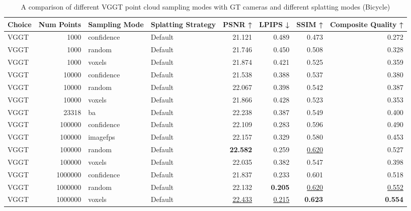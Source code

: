 \begin{table}[H]
\caption{A comparison of different VGGT point cloud sampling modes with GT cameras and different splatting modes (Bicycle)}
\label{tab:03_sampling_mode_splatting_strat_bicycle}
\small
\begin{tabular}{lrllrrrr}
\toprule
Choice & Num Points & Sampling Mode & Splatting Strategy & PSNR ↑ & LPIPS ↓ & SSIM ↑ & Composite Quality ↑ \\
\midrule
VGGT & 1000 & confidence & Default & 21.121 & 0.489 & 0.473 & 0.272 \\
VGGT & 1000 & random & Default & 21.746 & 0.450 & 0.508 & 0.328 \\
VGGT & 1000 & voxels & Default & 21.874 & 0.421 & 0.525 & 0.359 \\
VGGT & 10000 & confidence & Default & 21.538 & 0.388 & 0.537 & 0.380 \\
VGGT & 10000 & random & Default & 22.067 & 0.398 & 0.542 & 0.387 \\
VGGT & 10000 & voxels & Default & 21.866 & 0.428 & 0.523 & 0.353 \\
VGGT & 23318 & ba & Default & 22.238 & 0.387 & 0.549 & 0.400 \\
VGGT & 100000 & confidence & Default & 22.109 & 0.283 & 0.596 & 0.490 \\
VGGT & 100000 & imagefps & Default & 22.157 & 0.329 & 0.580 & 0.453 \\
VGGT & 100000 & random & Default & \textbf{22.582} & 0.259 & \underline{0.620} & 0.527 \\
VGGT & 100000 & voxels & Default & 22.035 & 0.382 & 0.547 & 0.398 \\
VGGT & 1000000 & confidence & Default & 21.837 & 0.233 & 0.601 & 0.518 \\
VGGT & 1000000 & random & Default & 22.132 & \textbf{0.205} & \underline{0.620} & \underline{0.552} \\
VGGT & 1000000 & voxels & Default & \underline{22.433} & \underline{0.215} & \textbf{0.623} & \textbf{0.554} \\
\bottomrule
\end{tabular}
\end{table}
